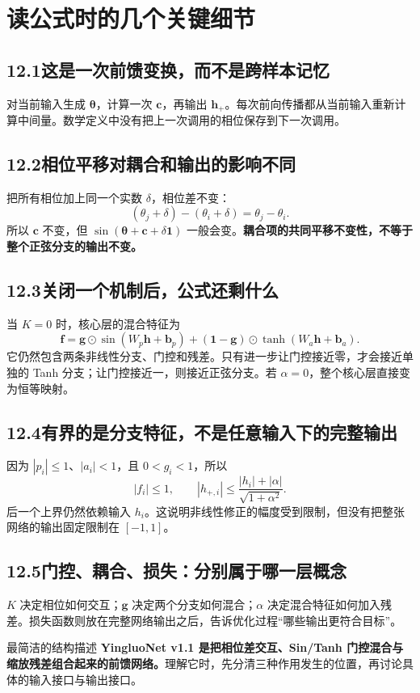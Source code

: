 \documentclass[UTF8,11pt,a4paper,fontset=fandol]{ctexart}
\newcommand{\newsection}[1]{\clearpage\section{#1}}
\begin{document}
\newsection{读公式时的几个关键细节}
\subsection*{12.1\quad 这是一次前馈变换，而不是跨样本记忆}
对当前输入生成 $\boldsymbol{\theta}$，计算一次 $\boldsymbol{c}$，再输出 $\boldsymbol{h}_{+}$。每次前向传播都从当前输入重新计算中间量。数学定义中没有把上一次调用的相位保存到下一次调用。
\subsection*{12.2\quad 相位平移对耦合和输出的影响不同}
把所有相位加上同一个实数 $\delta$，相位差不变：
\[
(\theta_j+\delta)-(\theta_i+\delta)=\theta_j-\theta_i.
\]
所以 $\boldsymbol{c}$ 不变，但 $\sin(\boldsymbol{\theta}+\boldsymbol{c}+\delta\boldsymbol{1})$ 一般会变。\textbf{耦合项的共同平移不变性，不等于整个正弦分支的输出不变。}
\subsection*{12.3\quad 关闭一个机制后，公式还剩什么}
当 $K=0$ 时，核心层的混合特征为
\[
\boldsymbol{f}=\boldsymbol{g}\odot\sin(W_p\boldsymbol{h}+\boldsymbol{b}_p)
+(\boldsymbol{1}-\boldsymbol{g})\odot\tanh(W_a\boldsymbol{h}+\boldsymbol{b}_a).
\]
它仍然包含两条非线性分支、门控和残差。只有进一步让门控接近零，才会接近单独的 Tanh 分支；让门控接近一，则接近正弦分支。若 $\alpha=0$，整个核心层直接变为恒等映射。
\subsection*{12.4\quad 有界的是分支特征，不是任意输入下的完整输出}
因为 $|p_i|\le1$、$|a_i|<1$，且 $0<g_i<1$，所以
\[
|f_i|\le1,\qquad
|h_{+,i}|\le\frac{|h_i|+|\alpha|}{\sqrt{1+\alpha^2}}.
\]
后一个上界仍然依赖输入 $h_i$。这说明非线性修正的幅度受到限制，但没有把整张网络的输出固定限制在 $[-1,1]$。
\subsection*{12.5\quad 门控、耦合、损失：分别属于哪一层概念}
$K$ 决定相位如何交互；$\boldsymbol{g}$ 决定两个分支如何混合；$\alpha$ 决定混合特征如何加入残差。损失函数则放在完整网络输出之后，告诉优化过程“哪些输出更符合目标”。
\begin{explain}{最简洁的结构描述}
\textbf{YingluoNet v1.1 是把相位差交互、Sin/Tanh 门控混合与缩放残差组合起来的前馈网络。}理解它时，先分清三种作用发生的位置，再讨论具体的输入接口与输出接口。
\end{explain}
\end{document}
